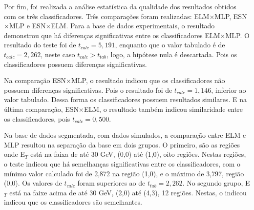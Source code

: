 %

%


Por fim, foi realizada a análise estatística da qualidade dos resultados obtidos com os três classificadores. Três comparações foram realizadas: ELM$\times$MLP, ESN$\times$MLP e ESN$\times$ELM. Para a base de dados experimentais, o resultado demonstrou que há diferenças significativas entre os classificadores ELM$\times$MLP. O resultado do teste foi de $t_{calc}=5,191$, enquanto que o valor tabulado é de $t_{calc}=2,262$, neste caso $t_{calc}> t_{tab}$, logo, a hipótese nula é descartada. Pois os classificadores possuem diferenças significativas.

Na comparação ESN$\times$MLP, o resultado  indicou que os classificadores não possuem diferenças significativas. Pois o resultado foi de $t_{calc}=1,146$, inferior ao valor tabulado. Dessa forma os classificadores possuem resultados similares. E na última comparação, ESN$\times$ELM, o resultado também indicou similaridade entre os classificadores, pois $t_{calc}=0,500$.

Na base de dados segmentada, com dados simulados, a comparação entre ELM e MLP resultou na separação da base em dois grupos. O primeiro, são as regiões onde E$_T$ está na faixa de até 30 GeV, (0,0) até (1,0), oito regiões. Nestas regiões, o teste indicou que há semelhanças significativas entre os classificadores, com o mínimo valor calculado foi de 2,872 na região (1,0), e o máximo de 3,797, região (0,0). Os valores de $t_{calc}$ foram superiores ao de $t_{tab}=2,262$. No segundo grupo, E$_T$ está na faixe acima de até 30 GeV, (2,0) até (4,3), 12 regiões. Nestas, o indicou indicou que os classificadores são semelhantes.

